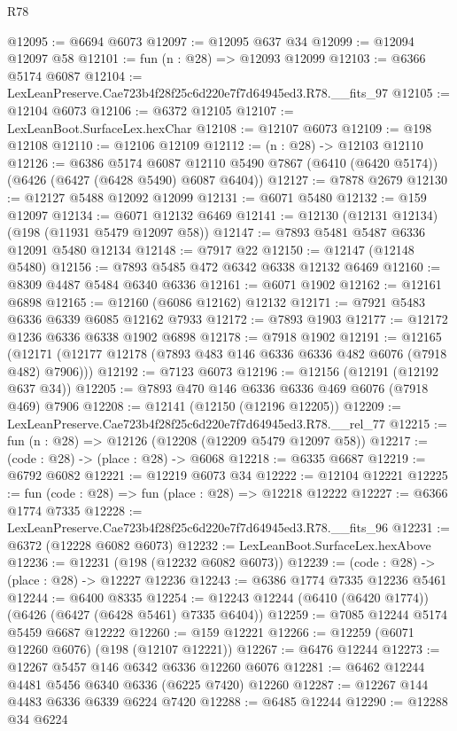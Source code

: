 \begin{lexlean}{R78}
\begin{coremodule}
@12095 := @6694 @6073
@12097 := @12095 @637 @34
@12099 := @12094 @12097 @58
@12101 := fun (n : @28) => @12093 @12099
@12103 := @6366 @5174 @6087
@12104 := LexLeanPreserve.Cae723b4f28f25c6d220e7f7d64945ed3.R78.__fits_97
@12105 := @12104 @6073
@12106 := @6372 @12105
@12107 := LexLeanBoot.SurfaceLex.hexChar
@12108 := @12107 @6073
@12109 := @198 @12108
@12110 := @12106 @12109
@12112 := (n : @28) -> @12103 @12110
@12126 := @6386
    @5174
    @6087
    @12110
    @5490
    @7867
    (@6410 (@6420 @5174))
    (@6426 (@6427 (@6428 @5490) @6087 @6404))
@12127 := @7878 @2679
@12130 := @12127 @5488 @12092 @12099
@12131 := @6071 @5480
@12132 := @159 @12097
@12134 := @6071 @12132 @6469
@12141 := @12130 (@12131 @12134) (@198 (@11931 @5479 @12097 @58))
@12147 := @7893 @5481 @5487 @6336 @12091 @5480 @12134
@12148 := @7917 @22
@12150 := @12147 (@12148 @5480)
@12156 := @7893 @5485 @472 @6342 @6338 @12132 @6469
@12160 := @8309 @4487 @5484 @6340 @6336
@12161 := @6071 @1902
@12162 := @12161 @6898
@12165 := @12160 (@6086 @12162) @12132
@12171 := @7921 @5483 @6336 @6339 @6085 @12162 @7933
@12172 := @7893 @1903
@12177 := @12172 @1236 @6336 @6338 @1902 @6898
@12178 := @7918 @1902
@12191 := @12165
    (@12171 (@12177 @12178 (@7893 @483 @146 @6336 @6336 @482 @6076 (@7918 @482) @7906)))
@12192 := @7123 @6073
@12196 := @12156 (@12191 (@12192 @637 @34))
@12205 := @7893 @470 @146 @6336 @6336 @469 @6076 (@7918 @469) @7906
@12208 := @12141 (@12150 (@12196 @12205))
@12209 := LexLeanPreserve.Cae723b4f28f25c6d220e7f7d64945ed3.R78.__rel_77
@12215 := fun (n : @28) => @12126 (@12208 (@12209 @5479 @12097 @58))
@12217 := (code : @28) -> (place : @28) -> @6068
@12218 := @6335 @6687
@12219 := @6792 @6082
@12221 := @12219 @6073 @34
@12222 := @12104 @12221
@12225 := fun (code : @28) => fun (place : @28) => @12218 @12222
@12227 := @6366 @1774 @7335
@12228 := LexLeanPreserve.Cae723b4f28f25c6d220e7f7d64945ed3.R78.__fits_96
@12231 := @6372 (@12228 @6082 @6073)
@12232 := LexLeanBoot.SurfaceLex.hexAbove
@12236 := @12231 (@198 (@12232 @6082 @6073))
@12239 := (code : @28) -> (place : @28) -> @12227 @12236
@12243 := @6386 @1774 @7335 @12236 @5461
@12244 := @6400 @8335
@12254 := @12243 @12244 (@6410 (@6420 @1774)) (@6426 (@6427 (@6428 @5461) @7335 @6404))
@12259 := @7085 @12244 @5174 @5459 @6687 @12222
@12260 := @159 @12221
@12266 := @12259 (@6071 @12260 @6076) (@198 (@12107 @12221))
@12267 := @6476 @12244
@12273 := @12267 @5457 @146 @6342 @6336 @12260 @6076
@12281 := @6462 @12244 @4481 @5456 @6340 @6336 (@6225 @7420) @12260
@12287 := @12267 @144 @4483 @6336 @6339 @6224 @7420
@12288 := @6485 @12244
@12290 := @12288 @34 @6224

\end{coremodule}
\end{lexlean}
